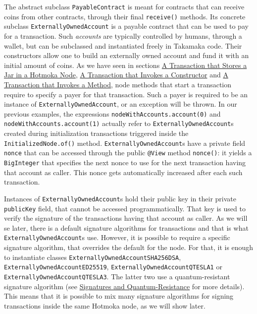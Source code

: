 \documentclass[a4paper,]{book}
\begin{document}
{The abstract subclass \texttt{PayableContract} is meant for contracts
that can receive coins from other contracts, through their final
\texttt{receive()} methods. Its concrete subclass
\texttt{ExternallyOwnedAccount} is a payable contract that can be used
to pay for a transaction. Such \emph{accounts} are typically controlled
by humans, through a wallet, but can be subclassed and instantiated
freely in Takamaka code. Their constructors allow one to build an
externally owned account and fund it with an initial amount of coins. As
we have seen in sections \protect\hyperlink{jar-transaction}{A
Transaction that Stores a Jar in a Hotmoka Node},
\protect\hyperlink{constructor-transaction}{A Transaction that Invokes a
Constructor} and \protect\hyperlink{method-transaction}{A Transaction
that Invokes a Method}, node methods that start a transaction require to
specify a payer for that transaction. Such a payer is required to be an
instance of \texttt{ExternallyOwnedAccount}, or an exception will be
thrown. In our previous examples, the expressions
\texttt{nodeWithAccounts.account(0)} and
\texttt{nodeWithAccounts.account(1)} actually refer to
\texttt{ExternallyOwnedAccount}s created during initialization
transactions triggered inside the \texttt{InitializedNode.of()} method.
\texttt{ExternallyOwnedAccount}s have a private field \texttt{nonce}
that can be accessed through the public \texttt{@View} method
\texttt{nonce()}: it yields a \texttt{BigInteger} that specifies the
next nonce to use for the next transaction having that account as
caller. This nonce gets automatically increased after each such
transaction.

Instances of \texttt{ExternallyOwnedAccount}s hold their public key in
their private \texttt{publicKey} field, that cannot be accessed
programmatically. That key is used to verify the signature of the
transactions having that account as caller. As we will se later, there
is a default signature algorithms for transactions and that is what
\texttt{ExternallyOwnedAccount}s use. However, it is possible to require
a specific signature algorithm, that overrides the default for the node.
For that, it is enough to instantiate classes
\texttt{ExternallyOwnedAccountSHA256DSA},
\texttt{ExternallyOwnedAccountED25519},
\texttt{ExternallyOwnedAccountQTESLA1} or
\texttt{ExternallyOwnedAccountQTESLA3}. The latter two use a
quantum-resistant signature algorithm (see
\protect\hyperlink{signatures-and-quantum-resistance}{Signatures and
Quantum-Resistance} for more details). This means that it is possible to
mix many signature algorithms for signing transactions inside the same
Hotmoka node, as we will show later.

}
\end{document}
